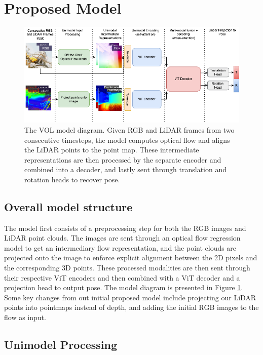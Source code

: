\documentclass[11pt,a4paper]{article}
\begin{document}
\clearpage
\section{Proposed Model}
\begin{figure} [t]
    \centering
    \includegraphics[width=0.95\linewidth]{Reports/2-Baselines-and-Model-Proposal/images/VOL_model.png}
    \caption {The VOL model diagram. Given RGB and LiDAR frames from two consecutive timesteps, the model computes optical flow and aligns the LiDAR points to the point map. These intermediate representations are then processed by the separate encoder and combined into a decoder, and lastly sent through translation and rotation heads to recover pose.}
    \label{fig:model-diagram}
\end{figure}

\subsection{Overall model structure}
The model first consists of a preprocessing step for both the RGB images and LiDAR point clouds. The images are sent through an optical flow regression model to get an intermediary flow representation, and the point clouds are projected onto the image to enforce explicit alignment between the 2D pixels and the corresponding 3D points. These processed modalities are then sent through their respective ViT encoders and then combined with a ViT decoder and a projection head to output pose. The model diagram is presented in Figure \ref{fig:model-diagram}. Some key changes from out initial proposed model include projecting our LiDAR points into pointmaps instead of depth, and adding the initial RGB images to the flow as input.


\subsection{Unimodel Processing}
\end{document}
